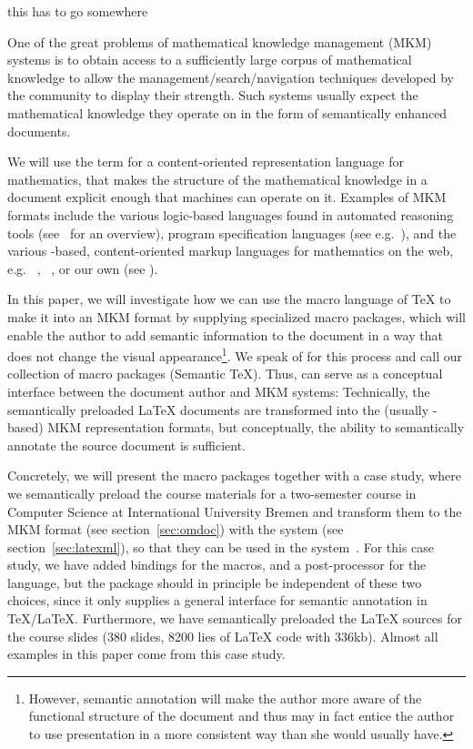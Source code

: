 \begin{oldpart}{this has to go somewhere}

One of the great problems of mathematical knowledge management (MKM) systems is to
obtain access to a sufficiently large corpus of mathematical knowledge to allow
the management/search/navigation techniques developed by the community to display
their strength. Such systems usually expect the mathematical knowledge they
operate on in the form of semantically enhanced documents.

We will use the term {} for a content-oriented representation language
for mathematics, that makes the structure of the mathematical knowledge in a document
explicit enough that machines can operate on it. Examples of MKM formats include the
various logic-based languages found in automated reasoning tools (see~\cite{RobVor:hoar01}
for an overview), program specification languages (see e.g.~\cite{Bergstra:as89}), and the
various {\xml}-based, content-oriented markup languages for mathematics on the web, e.g.
{\openmath}~\cite{BusCapCar:2oms04}, {\cmathml}~\cite{CarIon:MathML03}, or our own
{\omdoc} (see {}).

In this paper, we will investigate how we can use the macro language of {\TeX} to
make it into an MKM format by supplying specialized macro packages, which will
enable the author to add semantic information to the document in a way that does
not change the visual appearance\footnote{However, semantic annotation will make
  the author more aware of the functional structure of the document and thus may
  in fact entice the author to use presentation in a more consistent way than she
  would usually have.}. We speak of {} for this
process and call our collection of macro packages {\stex} (Semantic {\TeX}). Thus,
{\stex} can serve as a conceptual interface between the document author and MKM
systems: Technically, the semantically preloaded {\LaTeX} documents are
transformed into the (usually {\xml}-based) MKM representation formats, but
conceptually, the ability to semantically annotate the source document is
sufficient.

Concretely, we will present the {\stex} macro packages together with a case study,
where we semantically preload the course materials for a two-semester course in
Computer Science at International University Bremen and transform them to the
{\omdoc} MKM format (see section~\ref{sec:omdoc}) with the {\latexml} system (see
section~\ref{sec:latexml}), so that they can be used in the {\activemath}
system~\cite{activemathAIEDJ01}.  For this case study, we have added {\latexml}
bindings for the {\stex} macros, and a post-processor for the {\omdoc} language,
but the {\stex} package should in principle be independent of these two choices,
since it only supplies a general interface for semantic annotation in
{\TeX}/{\LaTeX}. Furthermore, we have semantically preloaded the {\LaTeX} sources
for the course slides (380 slides, 8200 lies of {\LaTeX} code with 336kb). Almost
all examples in this paper come from this case study.
\end{oldpart}
